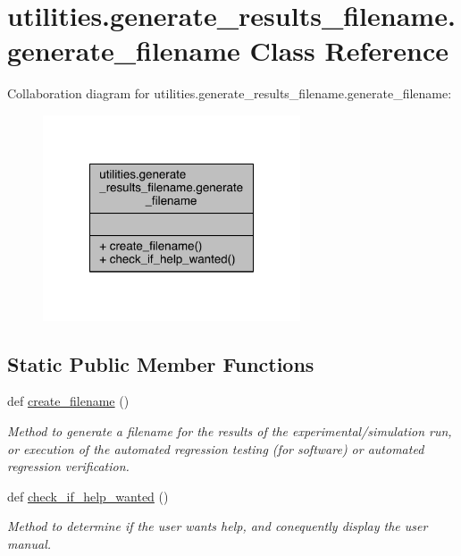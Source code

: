 \hypertarget{classutilities_1_1generate__results__filename_1_1generate__filename}{}\section{utilities.\+generate\+\_\+results\+\_\+filename.\+generate\+\_\+filename Class Reference}
\label{classutilities_1_1generate__results__filename_1_1generate__filename}


Collaboration diagram for utilities.\+generate\+\_\+results\+\_\+filename.\+generate\+\_\+filename\+:
\nopagebreak
\begin{figure}[H]
\begin{center}
\leavevmode
\includegraphics[width=216pt]{de/d27/classutilities_1_1generate__results__filename_1_1generate__filename__coll__graph}
\end{center}
\end{figure}
\subsection*{Static Public Member Functions}
\begin{DoxyCompactItemize}
\item 
def \hyperlink{classutilities_1_1generate__results__filename_1_1generate__filename_a9856498ab965f56a941ff46415b48906}{create\+\_\+filename} ()
\begin{DoxyCompactList}\small\item\em Method to generate a filename for the results of the experimental/simulation run, or execution of the automated regression testing (for software) or automated regression verification. \end{DoxyCompactList}\item 
def \hyperlink{classutilities_1_1generate__results__filename_1_1generate__filename_a9ea9390694e2e9707784bd8f7e8b2373}{check\+\_\+if\+\_\+help\+\_\+wanted} ()
\begin{DoxyCompactList}\small\item\em Method to determine if the user wants help, and conequently display the user manual. \end{DoxyCompactList}\end{DoxyCompactItemize}


